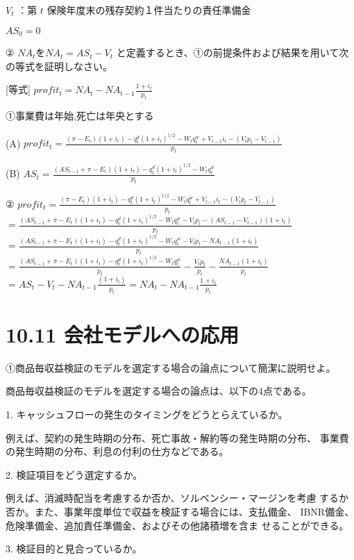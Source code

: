 \documentclass[report,gutter=10mm,fore-edge=10mm,uplatex,dvipdfmx]{jlreq}
\begin{document}
$V_t$ ：第 $t$ 保険年度末の残存契約１件当たりの責任準備金

$AS_0=0$

② $NA_t$を$NA_t=AS_t-V_t$ と定義するとき、①の前提条件および結果を用いて次の等式を証明しなさい。

[等式]
$profit_t=NA_t-NA_{t-1}\frac{1+i_t}{p_t}$

\answer{}

①事業費は年始,死亡は年央とする

(A) $profit_t=\frac{(\pi-E_t)(1+i_t)-q^d_t(1+i_t)^{1/2}-W_tq_t^w+V_{t-1}i_t-(V_tp_t-V_{t-1})}{p_t}$

(B) $AS_t = \frac{(AS_{t-1}+\pi-E_t)(1+i_t)-q^d_t(1+i_t)^{1/2}-W_tq^w_t}{p_t}$

②
$profit_t=\frac{(\pi-E_t)(1+i_t)-q^d_t(1+i_t)^{1/2}-W_tq_t^w+V_{t-1}i_t-(V_tp_t-V_{t-1})}{p_t}$\\
$= \frac{(AS_{t-1}+\pi-E_t)(1+i_t)-q^d_t(1+i_t)^{1/2}-W_tq_t^w-V_tp_t-(AS_{t-1}-V_{t-1})(1+i_t)}{p_t}$\\
$= \frac{(AS_{t-1}+\pi-E_t)(1+i_t)-q^d_t(1+i_t)^{1/2}-W_tq_t^w-V_tp_t-NA_{t-1}(1+i_t)}{p_t}$\\
$= \frac{(AS_{t-1}+\pi-E_t)(1+i_t)-q^d_t(1+i_t)^{1/2}-W_tq_t^w}{p_t}-\frac{V_tp_t}{p_t}-\frac{NA_{t-1}(1+i_t)}{p_t}$\\
$= AS_t-V_t-NA_{t-1}\frac{(1+i_t)}{p_t} = NA_t - NA_{t-1}\frac{1+i_t}{p_t}$


\section{10.11 会社モデルへの応用}

①商品毎収益検証のモデルを選定する場合の論点について簡潔に説明せよ。

\answer{}
商品毎収益検証のモデルを選定する場合の論点は、以下の4点である。

1. キャッシュフローの発生のタイミングをどうとらえているか。

例えば、契約の発生時期の分布、死亡事故・解約等の発生時期の分布、
事業費の発生時期の分布、利息の付利の仕方などである。

2. 検証項目をどう選定するか。

例えば、消滅時配当を考慮するか否か、ソルベンシー・マージンを考慮
するか否か。また、事業年度単位で収益を検証する場合には、支払備金、
IBNR備金、危険準備金、追加責任準備金、およびその他諸積増を含ま
せることができる。

3. 検証目的と見合っているか。
\end{document}
